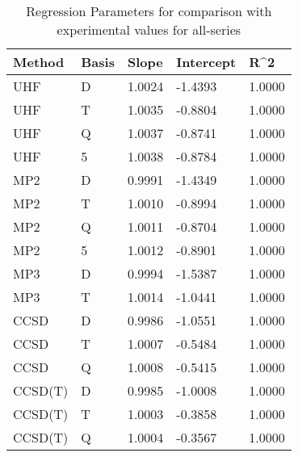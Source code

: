 \begin{table}
  \caption{Regression Parameters for comparison with experimental values for all-series}
  \label{tbl:regression-exp-all}
  \begin{tabular}{l l l l l }
    \hline
    Method & Basis & Slope & Intercept & R^2 \\ 
    \hline
    UHF & D & 1.0024 & -1.4393 & 1.0000 \\ 
    UHF & T & 1.0035 & -0.8804 & 1.0000 \\ 
    UHF & Q & 1.0037 & -0.8741 & 1.0000 \\ 
    UHF & 5 & 1.0038 & -0.8784 & 1.0000 \\ 
    MP2 & D & 0.9991 & -1.4349 & 1.0000 \\ 
    MP2 & T & 1.0010 & -0.8994 & 1.0000 \\ 
    MP2 & Q & 1.0011 & -0.8704 & 1.0000 \\ 
    MP2 & 5 & 1.0012 & -0.8901 & 1.0000 \\ 
    MP3 & D & 0.9994 & -1.5387 & 1.0000 \\ 
    MP3 & T & 1.0014 & -1.0441 & 1.0000 \\ 
    CCSD & D & 0.9986 & -1.0551 & 1.0000 \\ 
    CCSD & T & 1.0007 & -0.5484 & 1.0000 \\ 
    CCSD & Q & 1.0008 & -0.5415 & 1.0000 \\ 
    CCSD(T) & D & 0.9985 & -1.0008 & 1.0000 \\ 
    CCSD(T) & T & 1.0003 & -0.3858 & 1.0000 \\ 
    CCSD(T) & Q & 1.0004 & -0.3567 & 1.0000 \\ 
    \hline
  \end{tabular}
\end{table}
